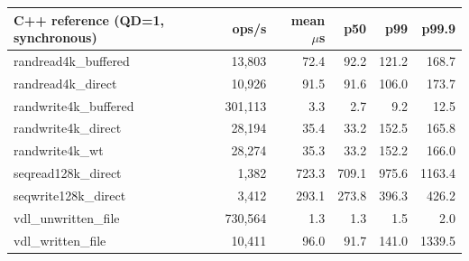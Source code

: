 \begin{tabular}{lrrrrr}
\toprule
C++ reference (QD=1, synchronous) & ops/s & mean $\mu$s & p50 & p99 & p99.9 \\
\midrule
randread4k\_buffered & 13,803 & 72.4 & 92.2 & 121.2 & 168.7 \\
randread4k\_direct & 10,926 & 91.5 & 91.6 & 106.0 & 173.7 \\
randwrite4k\_buffered & 301,113 & 3.3 & 2.7 & 9.2 & 12.5 \\
randwrite4k\_direct & 28,194 & 35.4 & 33.2 & 152.5 & 165.8 \\
randwrite4k\_wt & 28,274 & 35.3 & 33.2 & 152.2 & 166.0 \\
seqread128k\_direct & 1,382 & 723.3 & 709.1 & 975.6 & 1163.4 \\
seqwrite128k\_direct & 3,412 & 293.1 & 273.8 & 396.3 & 426.2 \\
vdl\_unwritten\_file & 730,564 & 1.3 & 1.3 & 1.5 & 2.0 \\
vdl\_written\_file & 10,411 & 96.0 & 91.7 & 141.0 & 1339.5 \\
\bottomrule
\end{tabular}

